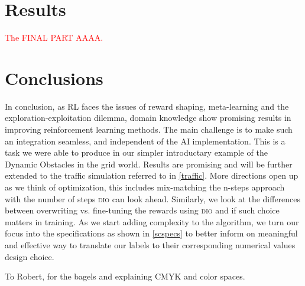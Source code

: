 \documentclass[acmsmall]{acmart}
\theoremstyle{definition}
\newcommand{\dio}{\textsc{dio}}
\begin{document}


\section{Results}
\textcolor{red}{The FINAL PART AAAA.}

 

\section{Conclusions}
In conclusion, as RL faces the issues of reward shaping, meta-learning and the exploration-exploitation dilemma, domain knowledge show promising results in 
improving reinforcement learning methods. The main challenge is to make such an integration seamless, and independent of the AI implementation. 
This is a task we were able to produce in our simpler introductary example of the Dynamic Obstacles in the grid world. Results are promising and will be further 
extended to the traffic simulation referred to in \ref{traffic}. More directions open up as we think of optimization, this includes mix-matching the n-steps approach with the 
number of steps \dio{} can look ahead. Similarly, we look at the differences between overwriting vs. fine-tuning the rewards using \dio{} and if such choice matters in training. 
As we start adding complexity to the algorithm, we turn our focus into the specifications as shown in \ref{scspecs} to better inform 
on meaningful and effective way to translate our labels to their corresponding numerical values design choice. 


\begin{acks}
To Robert, for the bagels and explaining CMYK and color spaces.
\end{acks}





\appendix
\end{document}
